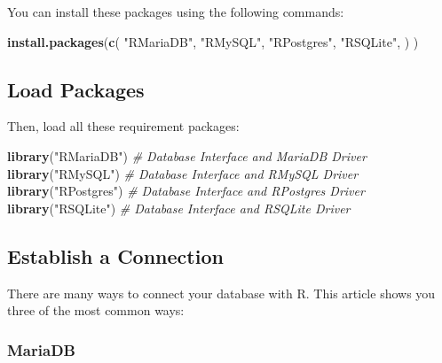 \documentclass[
]{book}
\newenvironment{Shaded}{\begin{snugshade}}{\end{snugshade}}
\newcommand{\CommentTok}[1]{\textcolor[rgb]{0.56,0.35,0.01}{\textit{#1}}}
\newcommand{\FunctionTok}[1]{\textcolor[rgb]{0.13,0.29,0.53}{\textbf{#1}}}
\newcommand{\NormalTok}[1]{#1}
\newcommand{\StringTok}[1]{\textcolor[rgb]{0.31,0.60,0.02}{#1}}
\begin{document}
You can install these packages using the following commands:

\begin{Shaded}
\begin{Highlighting}[]
\FunctionTok{install.packages}\NormalTok{(}\FunctionTok{c}\NormalTok{(}
                   \StringTok{"RMariaDB"}\NormalTok{,}
                   \StringTok{"RMySQL"}\NormalTok{,}
                   \StringTok{"RPostgres"}\NormalTok{,}
                   \StringTok{"RSQLite"}\NormalTok{,}
\NormalTok{                   )}
\NormalTok{                 )}
\end{Highlighting}
\end{Shaded}

\hypertarget{load-packages}{%
\subsection{Load Packages}\label{load-packages}}

Then, load all these requirement packages:

\begin{Shaded}
\begin{Highlighting}[]
\FunctionTok{library}\NormalTok{(}\StringTok{"RMariaDB"}\NormalTok{)                     }\CommentTok{\# Database Interface and \textquotesingle{}MariaDB\textquotesingle{} Driver}
\FunctionTok{library}\NormalTok{(}\StringTok{"RMySQL"}\NormalTok{)                       }\CommentTok{\# Database Interface and \textquotesingle{}RMySQL\textquotesingle{} Driver}
\FunctionTok{library}\NormalTok{(}\StringTok{"RPostgres"}\NormalTok{)                    }\CommentTok{\# Database Interface and \textquotesingle{}RPostgres\textquotesingle{} Driver}
\FunctionTok{library}\NormalTok{(}\StringTok{"RSQLite"}\NormalTok{)                      }\CommentTok{\# Database Interface and \textquotesingle{}RSQLite\textquotesingle{} Driver}
\end{Highlighting}
\end{Shaded}

\hypertarget{establish-a-connection}{%
\subsection{Establish a Connection}\label{establish-a-connection}}

There are many ways to connect your database with R. This article shows you three of the most common ways:

\hypertarget{mariadb}{%
\subsubsection*{MariaDB}\label{mariadb}}
\end{document}

